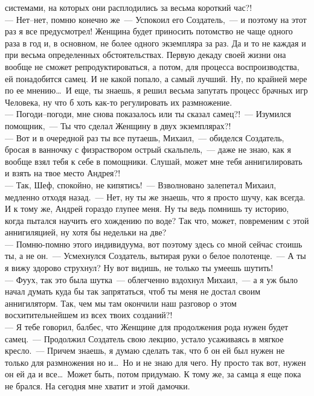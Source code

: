 системами, на которых они расплодились за весьма короткий час?!\\
--- Нет--нет, помню конечно же~--- Успокоил его Создатель,~--- и поэтому на 
этот раз я все предусмотрел! Женщина будет приносить потомство не чаще 
одного раза в год и, в основном, не более одного экземпляра за раз. Да и
то не каждая и при весьма определенных обстоятельствах. Первую декаду 
своей жизни она вообще не сможет репродуктироваться, а потом, для 
процесса воспроизводства, ей понадобится самец. И не какой попало, а 
самый лучший. Ну, по крайней мере по ее мнению\ldots\ И еще, ты знаешь, я 
решил весьма запутать процесс брачных игр Человека, ну что б хоть как-то
регулировать их размножение.\\
--- Погоди--погоди, мне снова показалось или 
ты сказал самец?!~--- Изумился помощник,~--- Ты что сделал Женщину в двух 
экземплярах?!\\
--- Вот и в очередной раз ты все путаешь, Михаил,~--- обиделся 
Создатель, бросая в ванночку с физраствором острый скальпель,~--- даже не 
знаю, как я вообще взял тебя к себе в помощники. Слушай, может мне тебя 
аннигилировать и взять на твое место Андрея?!\\
--- Так, Шеф, спокойно, не 
кипятись!~--- Взволновано залепетал Михаил, медленно отходя назад.~--- Нет, 
ну ты же знаешь, что я просто шучу, как всегда. И к тому же, Андрей 
гораздо глупее меня. Ну ты ведь помнишь ту историю, когда пытался 
научить его хождению по воде? Так что, может, повременим с этой 
аннигиляцией, ну хотя бы недельки на две?\\
--- Помню-помню этого 
индивидуума, вот поэтому здесь со мной сейчас стоишь ты, а не он.~--- 
Усмехнулся Создатель, вытирая руки о белое полотенце.~---  А ты я вижу 
здорово струхнул? Ну вот видишь, не только ты умеешь шутить!\\ 
--- Фуух, так
это была шутка~--- облегченно вздохнул Михаил,~--- а я уж было начал думать
куда бы так запрятаться, чтоб ты меня не достал своим аннигиляторм. 
Так, чем мы там окончили наш разговор о этом восхитительнейшем из всех  
твоих созданий?!\\
--- Я тебе говорил, балбес, что Женщине для продолжения рода нужен 
будет самец.~--- Продолжил Создатель свою лекцию, устало усаживаясь в 
мягкое кресло.~--- Причем знаешь, я думаю сделать так, что б он ей был 
нужен не только для размножения но и\ldots\ Но и не знаю для чего. Ну просто
так вот, нужен он ей да и все\ldots\ Может быть, потом придумаю. К тому же,
за самца я еще пока не брался. На сегодня мне хватит и этой дамочки.\\

